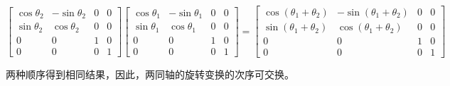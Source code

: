 \documentclass{homework}
\begin{document}
\begin{sol}
  \[
    \begin{bmatrix}
      \cos\theta_2 & -\sin\theta_2 & 0 & 0 \\
      \sin\theta_2 & \cos\theta_2 & 0 & 0 \\
      0 & 0 & 1 & 0 \\
      0 & 0 & 0 & 1
    \end{bmatrix}
    \begin{bmatrix}
      \cos\theta_1 & -\sin\theta_1 & 0 & 0 \\
      \sin\theta_1 & \cos\theta_1 & 0 & 0 \\
      0 & 0 & 1 & 0 \\
      0 & 0 & 0 & 1
    \end{bmatrix}
    =
    \begin{bmatrix}
      \cos(\theta_1 + \theta_2) & -\sin(\theta_1 + \theta_2) & 0 & 0 \\
      \sin(\theta_1 + \theta_2) & \cos(\theta_1 + \theta_2) & 0 & 0 \\
      0 & 0 & 1 & 0 \\
      0 & 0 & 0 & 1  
    \end{bmatrix} 
  \]

  两种顺序得到相同结果，因此，两同轴的旋转变换的次序可交换。
  
\end{sol}

\question 
\end{document}
